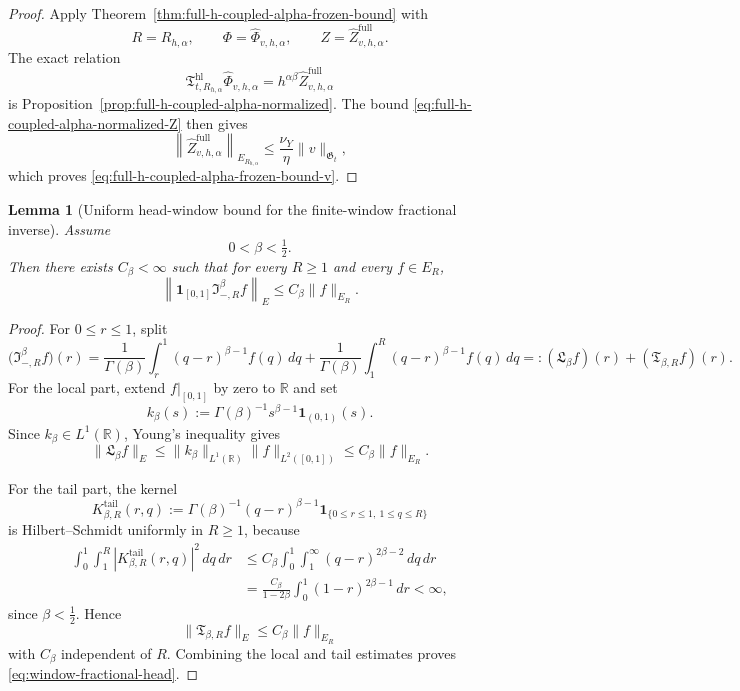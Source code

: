 \documentclass[11pt,a4paper]{amsart}
\theoremstyle{plain}
\newtheorem{lemma}[theorem]{Lemma}
\theoremstyle{definition}
\theoremstyle{remark}
\newcommand{\R}{\mathbb{R}}
\newcommand{\one}{\mathbf 1}
\begin{document}
\begin{proof}
Apply Theorem~\ref{thm:full-h-coupled-alpha-frozen-bound} with
\[
R=R_{h,\alpha},
\qquad
\Phi=\widehat\Phi_{v,h,\alpha},
\qquad
Z=\widehat Z_{v,h,\alpha}^{\mathrm{full}}.
\]
The exact relation
\[
\mathfrak T_{t,R_{h,\alpha}}^{\mathrm{hl}}\widehat\Phi_{v,h,\alpha}
=
h^{\alpha\beta}\widehat Z_{v,h,\alpha}^{\mathrm{full}}
\]
is Proposition~\ref{prop:full-h-coupled-alpha-normalized}. The bound
\eqref{eq:full-h-coupled-alpha-normalized-Z} then gives
\[
\left\|
\widehat Z_{v,h,\alpha}^{\mathrm{full}}
\right\|_{E_{R_{h,\alpha}}}
\le
\frac{\nu_Y}{\eta}\|v\|_{\mathfrak G_t},
\]
which proves \eqref{eq:full-h-coupled-alpha-frozen-bound-v}.
\end{proof}

\begin{lemma}[Uniform head-window bound for the finite-window fractional inverse]
\label{lem:window-fractional-head}
Assume
\[
0<\beta<\tfrac12.
\]
Then there exists \(C_\beta<\infty\) such that for every \(R\ge1\) and every \(f\in E_R\),
\begin{equation}\label{eq:window-fractional-head}
\left\|
\one_{[0,1]}\mathfrak I_{-,R}^{\beta}f
\right\|_{E}
\le
C_\beta\|f\|_{E_R}.
\end{equation}
\end{lemma}

\begin{proof}
For \(0\le r\le1\), split
\[
\bigl(
\mathfrak I_{-,R}^{\beta}f
\bigr)(r)
=
\frac{1}{\Gamma(\beta)}
\int_r^1 (q-r)^{\beta-1}f(q)\,dq
+
\frac{1}{\Gamma(\beta)}
\int_1^R (q-r)^{\beta-1}f(q)\,dq
=:
(\mathfrak L_{\beta}f)(r)+(\mathfrak T_{\beta,R}f)(r).
\]
For the local part, extend \(f|_{[0,1]}\) by zero to \(\R\) and set
\[
k_\beta(s):=\Gamma(\beta)^{-1}s^{\beta-1}\one_{(0,1)}(s).
\]
Since \(k_\beta\in L^1(\R)\), Young's inequality gives
\[
\|\mathfrak L_\beta f\|_{E}
\le
\|k_\beta\|_{L^1(\R)}\|f\|_{L^2([0,1])}
\le
C_\beta\|f\|_{E_R}.
\]

For the tail part, the kernel
\[
K_{\beta,R}^{\mathrm{tail}}(r,q)
:=
\Gamma(\beta)^{-1}(q-r)^{\beta-1}
\one_{\{0\le r\le1,\ 1\le q\le R\}}
\]
is Hilbert--Schmidt uniformly in \(R\ge1\), because
\begin{align*}
\int_0^1\int_1^R
\left|
K_{\beta,R}^{\mathrm{tail}}(r,q)
\right|^2\,dq\,dr
&\le
C_\beta
\int_0^1\int_1^\infty
(q-r)^{2\beta-2}\,dq\,dr \\
&=
\frac{C_\beta}{1-2\beta}
\int_0^1 (1-r)^{2\beta-1}\,dr
<
\infty,
\end{align*}
since \(\beta<\tfrac12\). Hence
\[
\|\mathfrak T_{\beta,R}f\|_{E}
\le
C_\beta\|f\|_{E_R}
\]
with \(C_\beta\) independent of \(R\). Combining the local and tail estimates proves
\eqref{eq:window-fractional-head}.
\end{proof}
\end{document}
